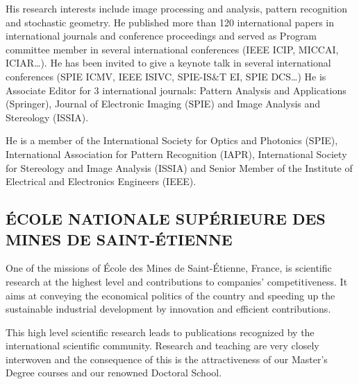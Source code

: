 His research interests include image processing and analysis, pattern recognition and stochastic geometry. He published more than 120 international papers in international journals and conference proceedings and served as Program committee member in several international conferences (IEEE ICIP, MICCAI, ICIAR…). He has been invited to give a keynote talk in several international conferences (SPIE ICMV, IEEE ISIVC, SPIE-IS\&T EI, SPIE DCS…)
He is Associate Editor for 3 international journals: Pattern Analysis and Applications (Springer), Journal of Electronic Imaging (SPIE) and Image Analysis and Stereology (ISSIA).

He is a member of the International Society for Optics and Photonics (SPIE), International Association for Pattern Recognition (IAPR), International Society for Stereology and Image Analysis (ISSIA) and Senior Member of the Institute of Electrical and Electronics Engineers (IEEE). 

\subsection*{\'ECOLE NATIONALE SUP\'ERIEURE DES MI\-NES DE SAINT-\'ETI\-EN\-NE}

One of the missions of École des Mines de Saint-Étienne, France, is scientific research at the highest level and contributions to companies’ competitiveness. It aims at conveying the economical politics of the country and speeding up the sustainable industrial development by innovation and efficient contributions.

This high level scientific research leads to publications recognized  by the international scientific community. Research and teaching are very closely interwoven and the consequence of this is the attractiveness of our Master’s Degree courses and our renowned Doctoral School.

